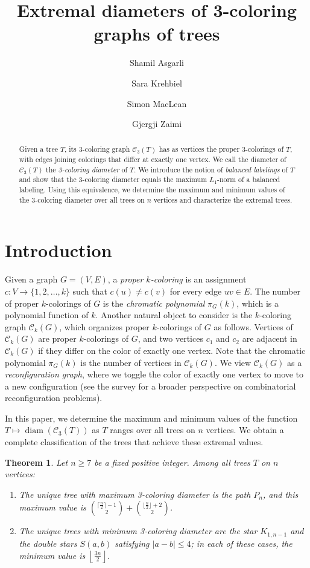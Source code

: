 \documentclass[12pt,reqno]{amsart}
\title{Extremal diameters of 3-coloring graphs of trees}
\author{Shamil Asgarli}
\author{Sara Krehbiel}
\author{Simon MacLean}
\author{Gjergji Zaimi}
\newtheorem{thm}{Theorem}[section]
\theoremstyle{definition}
\newcommand{\C}{\mathcal{C}}
\newcommand{\diam}{\operatorname{diam}}
\begin{document}
\begin{abstract}
Given a tree $T$, its 3-coloring graph $\mathcal{C}_3(T)$ has as vertices the proper 3-colorings of $T$, with edges joining colorings that differ at exactly one vertex. We call the diameter of $\mathcal{C}_3(T)$ the \emph{3-coloring diameter} of $T$. We introduce the notion of \emph{balanced labelings} of $T$ and show that the 3-coloring diameter equals the maximum $L_1$-norm of a balanced labeling. Using this equivalence, we determine the maximum and minimum values of the 3-coloring diameter over all trees on $n$ vertices and characterize the extremal trees.
\end{abstract}


\maketitle

\section{Introduction}

Given a graph $G=(V,E)$, a \emph{proper $k$-coloring} is an assignment $c\colon V\to \{1, 2, \dots, k\}$ such that $c(u)\neq c(v)$ for every edge $uv\in E$. The number of proper $k$-colorings of $G$ is the \emph{chromatic polynomial} $\pi_G(k)$, which is a polynomial function of $k$. Another natural object to consider is the $k$-coloring graph $\C_k(G)$, which organizes proper $k$-colorings of $G$ as follows. Vertices of $\C_k(G)$ are proper $k$-colorings of $G$, and two vertices $c_1$ and $c_2$ are adjacent in $\C_k(G)$ if they differ on the color of exactly one vertex. Note that the chromatic polynomial $\pi_G(k)$ is the number of vertices in $\C_k(G)$. We view $\C_k(G)$ as a \emph{reconfiguration graph}, where we toggle the color of exactly one vertex to move to a new configuration (see the survey \cite{Heu13} for a broader perspective on combinatorial reconfiguration problems).

In this paper, we determine the maximum and minimum values of the function $T\mapsto \diam(\C_3(T))$ as $T$ ranges over all trees on $n$ vertices. We obtain a complete classification of the trees that achieve these extremal values.

\begin{thm}\label{thm:main} Let $n\geq 7$ be a fixed positive integer. Among all trees $T$ on $n$ vertices:
\begin{enumerate}
    \item The unique tree with maximum 3-coloring diameter is the path $P_n$, and this maximum value is $\binom{\lceil\frac{n}{2}\rceil -1}{2}+\binom{\lfloor\frac{n}{2}\rfloor+2}{2}$.
    \item The unique trees with minimum 3-coloring diameter are the star $K_{1,n-1}$ and the double stars $S(a,b)$ satisfying $|a-b|\le 4$; in each of these cases, the minimum value is $\left\lfloor \tfrac{3n}{2}\right\rfloor$.  
\end{enumerate}
\end{thm}
\end{document}

